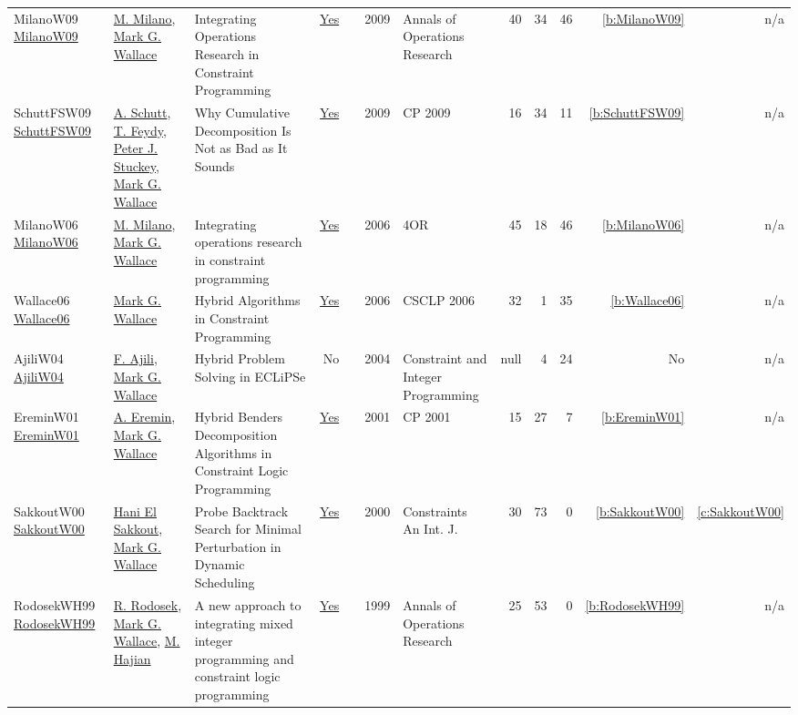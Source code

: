 {\begin{longtable}{>{\raggedright\arraybackslash}p{3cm}>{\raggedright\arraybackslash}p{6cm}>{\raggedright\arraybackslash}p{6.5cm}rrrp{2.5cm}rrrrr}
MilanoW09 \href{http://dx.doi.org/10.1007/s10479-009-0654-9}{MilanoW09} & \hyperref[auth:a144]{M. Milano}, \hyperref[auth:a117]{Mark G. Wallace} & Integrating Operations Research in Constraint Programming & \href{../works/MilanoW09.pdf}{Yes} & \cite{MilanoW09} & 2009 & Annals of Operations Research & 40 & 34 & 46 & \ref{b:MilanoW09} & n/a\\
SchuttFSW09 \href{https://doi.org/10.1007/978-3-642-04244-7_58}{SchuttFSW09} & \hyperref[auth:a125]{A. Schutt}, \hyperref[auth:a155]{T. Feydy}, \hyperref[auth:a126]{Peter J. Stuckey}, \hyperref[auth:a117]{Mark G. Wallace} & Why Cumulative Decomposition Is Not as Bad as It Sounds & \href{../works/SchuttFSW09.pdf}{Yes} & \cite{SchuttFSW09} & 2009 & CP 2009 & 16 & 34 & 11 & \ref{b:SchuttFSW09} & n/a\\
MilanoW06 \href{http://dx.doi.org/10.1007/s10288-006-0019-z}{MilanoW06} & \hyperref[auth:a144]{M. Milano}, \hyperref[auth:a117]{Mark G. Wallace} & Integrating operations research in constraint programming & \href{../works/MilanoW06.pdf}{Yes} & \cite{MilanoW06} & 2006 & 4OR & 45 & 18 & 46 & \ref{b:MilanoW06} & n/a\\
Wallace06 \href{http://dx.doi.org/10.1007/978-3-540-73817-6_1}{Wallace06} & \hyperref[auth:a117]{Mark G. Wallace} & Hybrid Algorithms in Constraint Programming & \href{../works/Wallace06.pdf}{Yes} & \cite{Wallace06} & 2006 & CSCLP 2006 & 32 & 1 & 35 & \ref{b:Wallace06} & n/a\\
AjiliW04 \href{http://dx.doi.org/10.1007/978-1-4419-8917-8_6}{AjiliW04} & \hyperref[auth:a960]{F. Ajili}, \hyperref[auth:a117]{Mark G. Wallace} & Hybrid Problem Solving in ECLiPSe & No & \cite{AjiliW04} & 2004 & Constraint and Integer Programming & null & 4 & 24 & No & n/a\\
EreminW01 \href{https://doi.org/10.1007/3-540-45578-7_1}{EreminW01} & \hyperref[auth:a1063]{A. Eremin}, \hyperref[auth:a117]{Mark G. Wallace} & Hybrid Benders Decomposition Algorithms in Constraint Logic Programming & \href{../works/EreminW01.pdf}{Yes} & \cite{EreminW01} & 2001 & CP 2001 & 15 & 27 & 7 & \ref{b:EreminW01} & n/a\\
SakkoutW00 \href{https://doi.org/10.1023/A:1009856210543}{SakkoutW00} & \hyperref[auth:a167]{Hani El Sakkout}, \hyperref[auth:a117]{Mark G. Wallace} & Probe Backtrack Search for Minimal Perturbation in Dynamic Scheduling & \href{../works/SakkoutW00.pdf}{Yes} & \cite{SakkoutW00} & 2000 & Constraints An Int. J. & 30 & 73 & 0 & \ref{b:SakkoutW00} & \ref{c:SakkoutW00}\\
RodosekWH99 \href{http://dx.doi.org/10.1023/a:1018904229454}{RodosekWH99} & \hyperref[auth:a299]{R. Rodosek}, \hyperref[auth:a117]{Mark G. Wallace}, \hyperref[auth:a1045]{M. Hajian} & A new approach to integrating mixed integer programming and constraint logic programming & \href{../works/RodosekWH99.pdf}{Yes} & \cite{RodosekWH99} & 1999 & Annals of Operations Research & 25 & 53 & 0 & \ref{b:RodosekWH99} & n/a\\

\end{longtable}}
